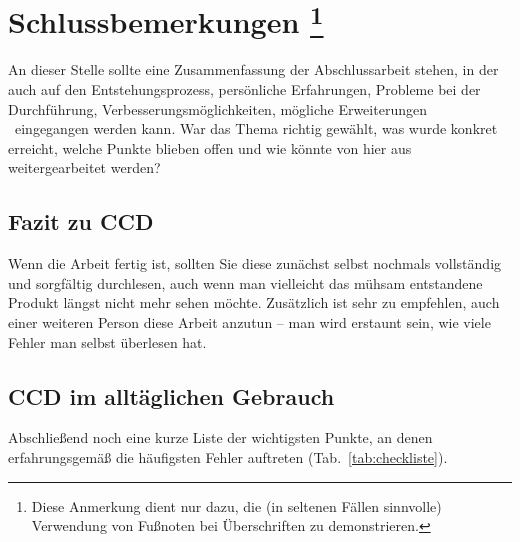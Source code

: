 \chapter[Schlussbemerkungen]%
        {Schlussbemerkungen%
        \protect\footnote{Diese Anmerkung dient nur dazu, die (in seltenen Fällen sinnvolle)
				Verwendung von Fußnoten bei Überschriften zu demonstrieren.}}%
\label{cha:Schluss}

An dieser Stelle sollte eine Zusammenfassung der Abschlussarbeit
stehen, in der auch auf den Entstehungsprozess, persönliche
Erfahrungen, Probleme bei der Durchführung,
Verbesserungsmöglichkeiten, mögliche %
Erweiterungen \usw\ eingegangen werden kann. War das Thema richtig
gewählt, was wurde konkret erreicht, welche Punkte blieben offen
und wie könnte von hier aus weitergearbeitet werden?


\section{Fazit zu CCD}

Wenn die Arbeit fertig ist, sollten Sie diese zunächst selbst nochmals vollständig und sorgfältig durchlesen, auch wenn man vielleicht das mühsam entstandene Produkt längst nicht mehr sehen möchte. Zusätzlich ist sehr zu empfehlen, auch einer weiteren Person diese Arbeit anzutun -- man wird erstaunt sein, wie viele Fehler man selbst überlesen hat. 



\section{CCD im alltäglichen Gebrauch}

Abschließend noch eine kurze Liste der wichtigsten Punkte, an denen erfahrungsgemäß die häufigsten Fehler auftreten (Tab.\ \ref{tab:checkliste}).


